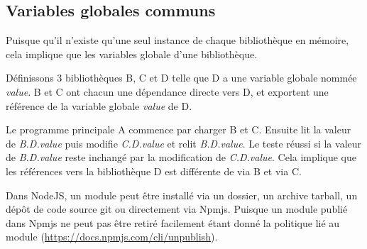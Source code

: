 \subsection{Variables globales communs}

Puisque qu'il n'existe qu'une seul instance de chaque bibliothèque en mémoire, cela implique
que les variables globale d'une bibliothèque.

Définissons 3 bibliothèques B, C et D telle que D a une variable globale nommée \textit{value}.
B et C ont chacun une dépendance directe vers D, et exportent une référence de la variable
globale \textit{value} de D.

Le programme principale A commence par charger B et C. Ensuite lit la valeur de \textit{B.D.value}
puis modifie \textit{C.D.value} et relit \textit{B.D.value}. Le teste réussi si la valeur de
\textit{B.D.value} reste inchangé par la modification de \textit{C.D.value}. Cela implique que
les références vers la bibliothèque D est différente de via B et via C.

Dans NodeJS, un module peut être installé via un dossier, un archive tarball, un dépôt de code source git ou
directement via Npmjs. Puisque un module publié dans Npmjs ne peut pas être retiré facilement étant donné
la politique lié au module (\url{https://docs.npmjs.com/cli/unpublish}).
